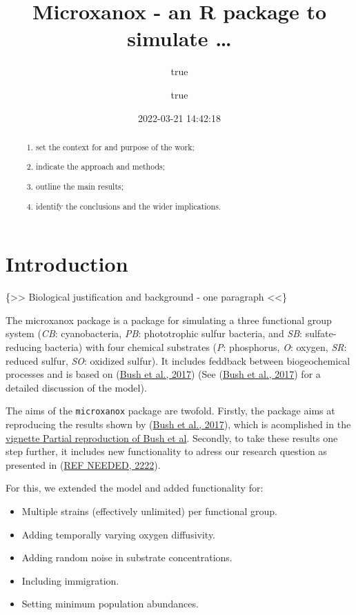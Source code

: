 \documentclass[
]{article}
\title{Microxanox - an R package to simulate \ldots{}}
\author{true \and true}
\date{2022-03-21 14:42:18}
\providecommand{\tightlist}{%
  \setlength{\itemsep}{0pt}\setlength{\parskip}{0pt}}
\begin{document}
\maketitle
\begin{abstract}
\begin{enumerate}
\def\labelenumi{\arabic{enumi}.}
\tightlist
\item
  set the context for and purpose of the work;
\item
  indicate the approach and methods;
\item
  outline the main results;
\item
  identify the conclusions and the wider implications.
\end{enumerate}
\end{abstract}

{
\hypersetup{linkcolor=}
\setcounter{tocdepth}{2}
\tableofcontents
}
\hypertarget{introduction}{%
\section{Introduction}\label{introduction}}

\{\textgreater\textgreater{} Biological justification and background - one paragraph \textless\textless\}

The microxanox package is a package for simulating a three functional group system (\emph{CB}: cyanobacteria, \emph{PB}: phototrophic sulfur bacteria, and \emph{SB}: sulfate-reducing bacteria) with four chemical substrates (\emph{P}: phosphorus, \emph{O}: oxygen, \emph{SR}: reduced sulfur, \emph{SO}: oxidized sulfur). It includes feddback between biogeochemical processes and is based on (\protect\hyperlink{ref-Bush2017}{Bush et al., 2017}) (See (\protect\hyperlink{ref-Bush2017}{Bush et al., 2017}) for a detailed discussion of the model).

The aims of the \texttt{microxanox} package are twofold. Firstly, the package aims at reproducing the results shown by (\protect\hyperlink{ref-Bush2017}{Bush et al., 2017}), which is acomplished in the \href{LINK\%20NEEDED}{vignette Partial reproduction of Bush et al}. Secondly, to take these results one step further, it includes new functionality to adress our research question as presented in (\protect\hyperlink{ref-REF_NEEDED}{REF NEEDED, 2222}).

For this, we extended the model and added functionality for:

\begin{itemize}
\tightlist
\item
  Multiple strains (effectively unlimited) per functional group.
\item
  Adding temporally varying oxygen diffusivity.
\item
  Adding random noise in substrate concentrations.
\item
  Including immigration.
\item
  Setting minimum population abundances.
\end{itemize}
\end{document}
